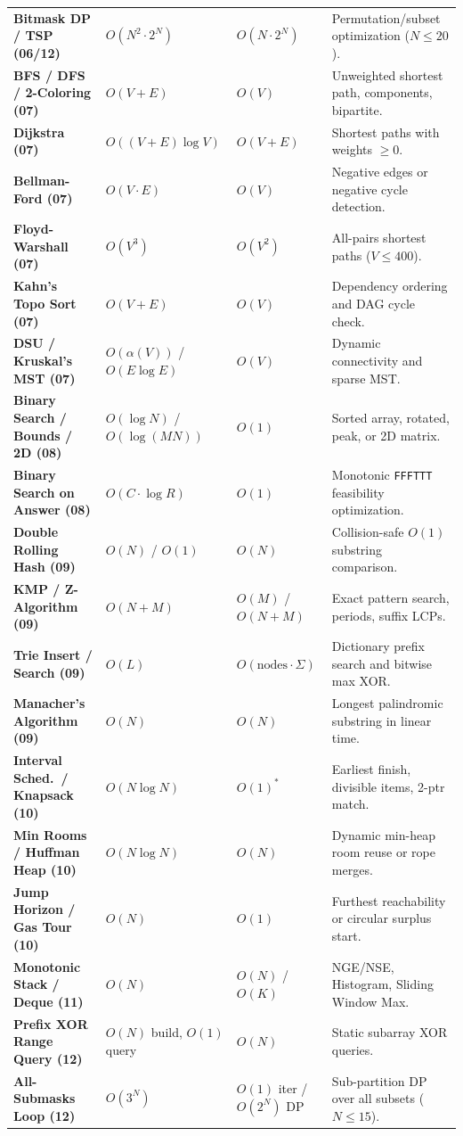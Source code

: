 \documentclass[11pt,a4paper]{article}
\begin{document}
\begin{xltabular}{\textwidth}{>{\raggedright\arraybackslash\bfseries}p{3.8cm} >{\centering\arraybackslash}p{2.6cm} >{\centering\arraybackslash}p{2.2cm} >{\raggedright\arraybackslash}X}
Bitmask DP / TSP (06/12) & $O(N^2 \cdot 2^N)$ & $O(N \cdot 2^N)$ & Permutation/subset optimization ($N \le 20$). \\
BFS / DFS / 2-Coloring (07) & $O(V + E)$ & $O(V)$ & Unweighted shortest path, components, bipartite. \\
Dijkstra (07) & $O((V + E) \log V)$ & $O(V + E)$ & Shortest paths with weights $\ge 0$. \\
Bellman-Ford (07) & $O(V \cdot E)$ & $O(V)$ & Negative edges or negative cycle detection. \\
Floyd-Warshall (07) & $O(V^3)$ & $O(V^2)$ & All-pairs shortest paths ($V \le 400$). \\
Kahn's Topo Sort (07) & $O(V + E)$ & $O(V)$ & Dependency ordering and DAG cycle check. \\
DSU / Kruskal's MST (07) & $O(\alpha(V))$ / $O(E \log E)$ & $O(V)$ & Dynamic connectivity and sparse MST. \\
Binary Search / Bounds / 2D (08) & $O(\log N)$ / $O(\log(MN))$ & $O(1)$ & Sorted array, rotated, peak, or 2D matrix. \\
Binary Search on Answer (08) & $O(C \cdot \log R)$ & $O(1)$ & Monotonic \texttt{FFFTTT} feasibility optimization. \\
Double Rolling Hash (09) & $O(N)$ / $O(1)$ & $O(N)$ & Collision-safe $O(1)$ substring comparison. \\
KMP / Z-Algorithm (09) & $O(N + M)$ & $O(M)$ / $O(N{+}M)$ & Exact pattern search, periods, suffix LCPs. \\
Trie Insert / Search (09) & $O(L)$ & $O(\text{nodes} \cdot \Sigma)$ & Dictionary prefix search and bitwise max XOR. \\
Manacher's Algorithm (09) & $O(N)$ & $O(N)$ & Longest palindromic substring in linear time. \\
Interval Sched.\ / Knapsack (10) & $O(N \log N)$ & $O(1)^*$ & Earliest finish, divisible items, 2-ptr match. \\
Min Rooms / Huffman Heap (10) & $O(N \log N)$ & $O(N)$ & Dynamic min-heap room reuse or rope merges. \\
Jump Horizon / Gas Tour (10) & $O(N)$ & $O(1)$ & Furthest reachability or circular surplus start. \\
Monotonic Stack / Deque (11) & $O(N)$ & $O(N)$ / $O(K)$ & NGE/NSE, Histogram, Sliding Window Max. \\
Prefix XOR Range Query (12) & $O(N)$ build, $O(1)$ query & $O(N)$ & Static subarray XOR queries. \\
All-Submasks Loop (12) & $O(3^N)$ & $O(1)$ iter / $O(2^N)$ DP & Sub-partition DP over all subsets ($N \le 15$). \\

\end{xltabular}
\end{document}
